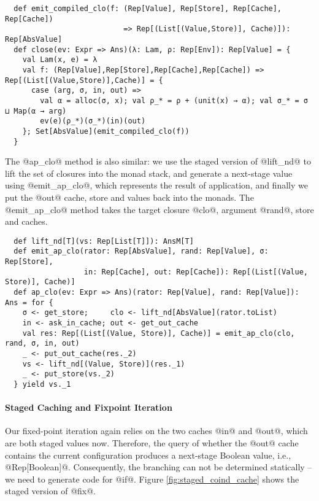 \begin{lstlisting}
  def emit_compiled_clo(f: (Rep[Value], Rep[Store], Rep[Cache], Rep[Cache])
                           => Rep[(List[(Value,Store)], Cache)]): Rep[AbsValue]
  def close(ev: Expr => Ans)(λ: Lam, ρ: Rep[Env]): Rep[Value] = {
    val Lam(x, e) = λ
    val f: (Rep[Value],Rep[Store],Rep[Cache],Rep[Cache]) => Rep[(List[(Value,Store)],Cache)] = {
      case (arg, σ, in, out) =>
        val α = alloc(σ, x); val ρ_* = ρ + (unit(x) → α); val σ_* = σ ⊔ Map(α → arg)
        ev(e)(ρ_*)(σ_*)(in)(out)
    }; Set[AbsValue](emit_compiled_clo(f))
  }
\end{lstlisting}

The @ap_clo@ method is also similar: we use the staged version of @lift_nd@ to
lift the set of closures into the monad stack, and generate a next-stage value
using @emit_ap_clo@, which represents the result of application, and finally we
put the @out@ cache, store and values back into the monads. The @emit_ap_clo@
method takes the target closure @clo@, argument @rand@, store and caches.

\begin{lstlisting}
  def lift_nd[T](vs: Rep[List[T]]): AnsM[T]
  def emit_ap_clo(rator: Rep[AbsValue], rand: Rep[Value], σ: Rep[Store],
                  in: Rep[Cache], out: Rep[Cache]): Rep[(List[(Value, Store)], Cache)]
  def ap_clo(ev: Expr => Ans)(rator: Rep[Value], rand: Rep[Value]): Ans = for {
    σ <- get_store;     clo <- lift_nd[AbsValue](rator.toList)
    in <- ask_in_cache; out <- get_out_cache
    val res: Rep[(List[(Value, Store)], Cache)] = emit_ap_clo(clo, rand, σ, in, out)
    _ <- put_out_cache(res._2)
    vs <- lift_nd[(Value, Store)](res._1)
    _ <- put_store(vs._2)
  } yield vs._1
\end{lstlisting}

\paragraph{Staged Caching and Fixpoint Iteration} 

Our fixed-point iteration again relies on the two caches @in@ and @out@, which are
both staged values now. Therefore, the query of whether the @out@ cache contains
the current configuration produces a next-stage Boolean value, i.e.,
@Rep[Boolean]@. Consequently, the branching can not be determined statically --
we need to generate code for @if@. Figure \ref{fig:staged_coind_cache} shows the
staged version of @fix@.

